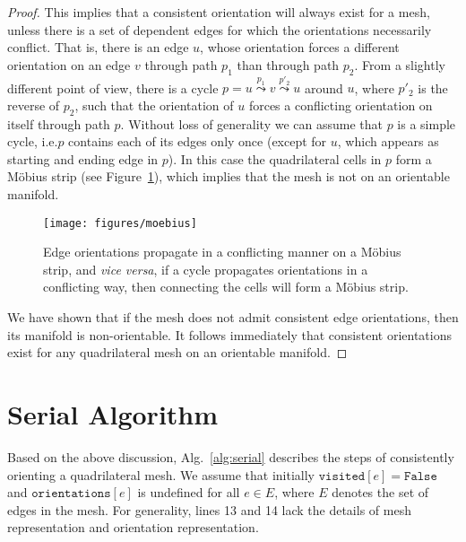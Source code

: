 \documentclass[oneeqnum,onethmnum,onefignum,onetabnum]{siamltex1213}
\begin{document}
\begin{proof}
This implies that a consistent orientation will always exist for a mesh,
unless there is a set of dependent edges for which the orientations necessarily
conflict. That is, there is an edge $u$, whose orientation forces a
different orientation on an edge $v$ through path $ p_1 $ than through path
$ p_2 $. From a slightly different point of view, there is a cycle $ p = u
\overset{p_1}{\leadsto} v \overset{p'_2}{\leadsto} u $ around $u$, where $
p'_2 $ is the reverse of $ p_2 $, such that the orientation of $u$ forces a
conflicting orientation on itself through path $p$. Without loss of
generality we can assume that $p$ is a simple cycle, i.e.\@ $p$ contains
each of its edges only once (except for $u$, which appears as starting and
ending edge in $p$). In this case the quadrilateral cells in $p$ form a
Möbius strip (see Figure~\ref{fig:moebius_strip}), which implies that the
mesh is not on an orientable manifold.

\begin{figure}
  \centering
  \texttt{[image: figures/moebius]}

  \caption{Edge orientations propagate in a conflicting manner on
    a Möbius strip, and \textit{vice versa}, if a cycle propagates
    orientations in a conflicting way, then connecting the cells will
    form a Möbius strip.}
  \label{fig:moebius_strip}
\end{figure}

We have shown
that if the mesh does not admit consistent edge orientations, then its
manifold is non-orientable. It follows immediately that consistent orientations
exist for any quadrilateral mesh on an orientable manifold.
\end{proof}

\section{Serial Algorithm}
\label{sec:serial}

Based on the above discussion, Alg.~\ref{alg:serial} describes
the steps of consistently orienting a quadrilateral mesh. We assume
that initially $ \mathtt{visited}[e] = \mathtt{False} $ and
$ \mathtt{orientations}[e] $
is undefined for all $ e \in E $, where $ E $ denotes the set
of edges in the mesh. For generality, lines 13 and 14 lack the details
of mesh representation and orientation representation.
\end{document}
